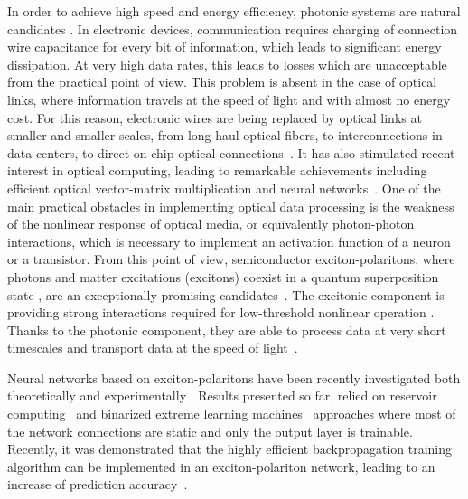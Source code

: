 \documentclass[
 print,
 amsmath,amssymb,
 aps,
]{revtex4-2}
\begin{document}
	In order to achieve high speed and energy efficiency, photonic systems are natural candidates \cite{Psaltis_Photonic,Feldmann_AllOpticalSpikingNetwork, Soljacic_DeepLearning,Lin,Tait_LightTech_2014,antonik2019human,Wetzstein_review,Shastri_review,Xu_TOPS,McMahon_SinglePhoton}. In electronic devices, communication requires charging of  connection wire capacitance for every bit of information, which leads to significant energy dissipation. At very high data rates, this leads to losses which are unacceptable from the practical point of view. This problem is absent in the case of optical links, where information travels at the speed of light and with almost no energy cost. For this reason, electronic wires are being replaced by optical links at smaller and smaller scales, from long-haul optical fibers, to interconnections in data centers, to direct on-chip optical connections~\cite{sun2015single}. It has also stimulated recent interest in optical computing, leading to remarkable achievements including efficient optical vector-matrix multiplication and neural networks~\cite{Brunner_ReinforcementLearning,Zuo_AllOpticalNN}. 
	One of the main practical obstacles in implementing optical data processing is the weakness of the nonlinear response of optical media, or equivalently photon-photon interactions, which is necessary to implement an activation function of a neuron or a transistor. From this point of view, semiconductor exciton-polaritons, where photons and matter excitations (excitons) coexist in a quantum superposition state \cite{Kavokin_book}, are an exceptionally promising candidates~\cite{Matuszewski_EnergyEfficient}. The excitonic component is providing strong interactions required for low-threshold nonlinear operation \cite{Delteil_NatMat, Dreismann_NatMat}. Thanks to the photonic component, they are able to process data at very short timescales and transport data at the speed of light~\cite{Sanvitto_Transistor,Savvidis_TransistorSwitch,Lagoudakis_RTOrganicTransistor}.
	
	Neural networks based on exciton-polaritons have been recently investigated both theoretically \cite{EspinozaOrtega_PRL2015, Xu_PRA2020, Opala_NeuromorphicComputing,Matuszewski_EnergyEfficient} and experimentally \cite{Ballarini_Neuromorphic, Mirek_XOR, Opala_Backpropagation}. Results presented so far, relied on reservoir computing~\cite{Opala_NeuromorphicComputing} and binarized extreme learning machines~\cite{Huang_ExtremeLearningMachines} approaches where most of the network connections are static and only the output layer is trainable. Recently, it was demonstrated that the highly efficient backpropagation training algorithm can be implemented in an exciton-polariton network, leading to an increase of  prediction accuracy~\cite{Opala_Backpropagation}. 
	
\end{document}

